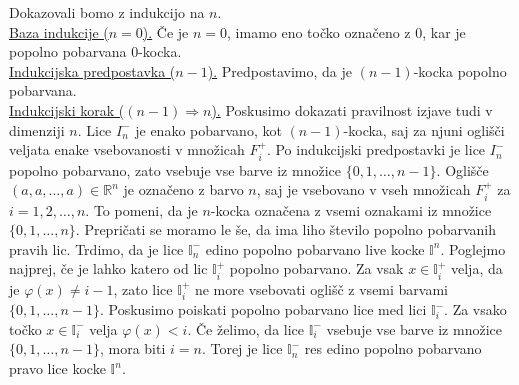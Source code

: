\documentclass[mat1]{fmfdelo}
\newcommand{\R}{\mathbb R}
\newcommand{\I}{\mathbb I}
\newcommand{\0}{\underline{0}}
\begin{document}
\begin{dokaz}
\begin{figure}[h!]
\end{figure}
%
Dokazovali bomo z indukcijo na $n$.\\
\underline{Baza indukcije ($n = 0$).}
Če je $n=0$, imamo eno točko označeno z $0$, kar je popolno pobarvana $0$-kocka.\\
\underline{Indukcijska predpostavka ($n - 1$).}
Predpostavimo, da je $(n-1)$-kocka popolno pobarvana. \\
\underline{Indukcijski korak ($(n - 1) \Longrightarrow n$).}
Poskusimo dokazati pravilnost izjave tudi v dimenziji $n$. Lice $I_n^-$ je enako pobarvano, kot $(n-1)$-kocka, saj za njuni oglišči veljata enake vsebovanosti v množicah $F_i^+$. Po indukcijski predpostavki je lice $I_n^-$ popolno pobarvano, zato vsebuje vse barve iz množice $\{ 0, 1, \dots, n-1\}$. Oglišče $(a, a, \dots, a) \in \R^n$ je označeno z barvo $n$, saj je vsebovano v vseh množicah $F_i^+$ za $i = 1, 2, \dots, n$. To pomeni, da je $n$-kocka označena z vsemi oznakami iz množice $\{ 0, 1, \dots, n \}$. Prepričati se moramo le še, da ima liho število popolno pobarvanih pravih lic. 
Trdimo, da je lice $\I_n^-$ edino popolno pobarvano live kocke $\I^n$. Poglejmo najprej, če je lahko katero od lic $\I_i^+$ popolno pobarvano. Za vsak $x \in \I_i^+$ velja, da je $\varphi (x) \neq i-1$, zato lice $\I_i^+$ ne more vsebovati oglišč z vsemi barvami $\{ 0, 1, \dots, n - 1 \}$. Poskusimo poiskati popolno pobarvano lice med lici $\I_i^-$. Za vsako točko $x \in \I_i^-$ velja $\varphi (x) < i$. Če želimo, da lice $\I_i^-$ vsebuje vse barve iz množice $\{ 0, 1, \dots, n - 1 \}$, mora biti $i = n$. Torej je lice $\I_n^-$ res edino popolno pobarvano pravo lice kocke $\I^n$.


\end{dokaz}
\end{document}
